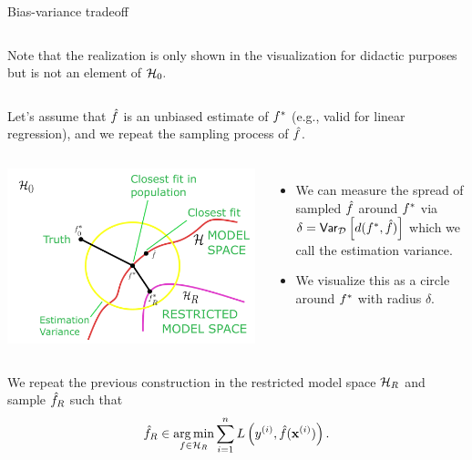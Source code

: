 \documentclass[11pt,compress,t,notes=noshow, xcolor=table]{beamer}
\begin{document}
\begin{vbframe}{Bias-variance tradeoff}
\begin{columns}[onlytextwidth,T]
      \lz
      Note that the realization is only shown in the visualization for didactic purposes but is not an element of $\mathcal{H}_0.$
    
    \end{columns}

\framebreak

Let's assume that $\hat{f}$ is an unbiased estimate of $f^{\ast}$ (e.g., valid for linear regression), and we repeat the sampling process of $\hat{f}$.

\begin{columns}[onlytextwidth,T]

  \includegraphics[width=1.0\textwidth]{figure_man/bv_anim_3.pdf}

      \lz 
      \begin{itemize}
          \item We can measure the spread of sampled $\hat{f}$ around $f^{\ast}$ via $\delta = \mathsf{Var}_{\mathcal{D}}\left[d(f^{\ast}, \hat{f})\right]$ which we call the estimation variance.
          \item We visualize this as a circle around $f^{\ast}$ with radius $\delta.$
      \end{itemize}
    \end{columns}

\framebreak

We repeat the previous construction in the restricted model space $\mathcal{H}_R$ and sample $\hat{f}_R$ such that 
$$\hat{f}_R \in \operatorname*{arg\,min}_{f\in\mathcal{H}_R} \sum\limits_{i=1}^n L\left(y^{(i)}, \hat{f} (\mathbf{x}^{(i)})\right).$$
\begin{columns}[onlytextwidth,T]


\end{columns}
\end{vbframe}
\end{document}
